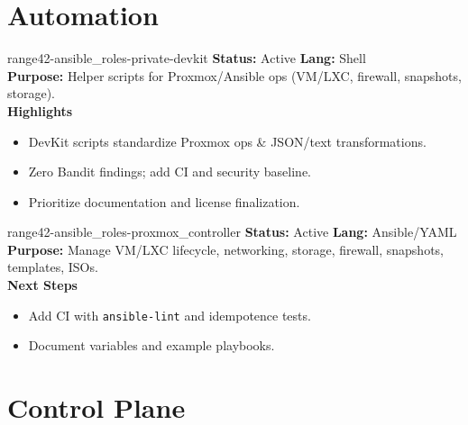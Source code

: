 \documentclass[aspectratio=169]{beamer}
\begin{document}

\section{Automation}

\begin{frame}{range42-ansible\_roles-private-devkit \; \faTerminal}
  \textbf{Status:} Active \hfill \textbf{Lang:} Shell\\[2mm]
  \textbf{Purpose:} Helper scripts for Proxmox/Ansible ops (VM/LXC, firewall, snapshots, storage).\\[2mm]
  \textbf{Highlights}
  \begin{itemize}
    \item DevKit scripts standardize Proxmox ops \& JSON/text transformations.
    \item \alert{Zero Bandit findings}; add CI and security baseline.
    \item Prioritize documentation and license finalization.
  \end{itemize}
\end{frame}

\begin{frame}{range42-ansible\_roles-proxmox\_controller \; \faCogs}
  \textbf{Status:} Active \hfill \textbf{Lang:} Ansible/YAML\\[2mm]
  \textbf{Purpose:} Manage VM/LXC lifecycle, networking, storage, firewall, snapshots, templates, ISOs.\\[2mm]
  \textbf{Next Steps}
  \begin{itemize}
    \item Add CI with \texttt{ansible-lint} and idempotence tests.
    \item Document variables and example playbooks.
  \end{itemize}
\end{frame}

\section{Control Plane}
\end{document}
